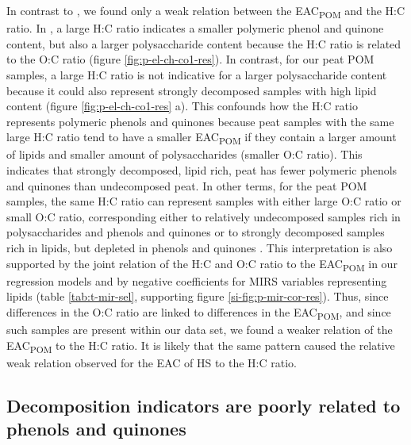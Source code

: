 \documentclass[draft,linenumbers]{agujournal2018}
\begin{document}
In contrast to \citet{Aeschbacher.2012}, we found only a weak relation
between the EAC\textsubscript{POM} and the H:C ratio. In
\citet{Aeschbacher.2012}, a large H:C ratio indicates a smaller
polymeric phenol and quinone content, but also a larger polysaccharide
content because the H:C ratio is related to the O:C ratio (figure
\ref{fig:p-el-ch-co1-res}). In contrast, for our peat POM samples, a
large H:C ratio is not indicative for a larger polysaccharide content
because it could also represent strongly decomposed samples with high
lipid content (figure \ref{fig:p-el-ch-co1-res} a). This confounds how
the H:C ratio represents polymeric phenols and quinones because peat
samples with the same large H:C ratio tend to have a smaller
EAC\textsubscript{POM} if they contain a larger amount of lipids and
smaller amount of polysaccharides (smaller O:C ratio). This indicates
that strongly decomposed, lipid rich, peat has fewer polymeric phenols
and quinones than undecomposed peat. In other terms, for the peat POM
samples, the same H:C ratio can represent samples with either large O:C
ratio or small O:C ratio, corresponding either to relatively
undecomposed samples rich in polysaccharides and phenols and quinones or
to strongly decomposed samples rich in lipids, but depleted in phenols
and quinones \citep{Kim.2003, Leifeld.2012, Bader.2018}. This
interpretation is also supported by the joint relation of the H:C and
O:C ratio to the EAC\textsubscript{POM} in our regression models and by
negative coefficients for MIRS variables representing lipids (table
\ref{tab:t-mir-sel}, supporting figure \ref{si-fig:p-mir-cor-res}).
Thus, since differences in the O:C ratio are linked to differences in
the EAC\textsubscript{POM}, and since such samples are present within
our data set, we found a weaker relation of the EAC\textsubscript{POM}
to the H:C ratio. It is likely that the same pattern caused the relative
weak relation \citet{Tan.2017} observed for the EAC of HS to the H:C
ratio.

\subsection{Decomposition indicators are poorly related to phenols and
quinones}
\end{document}

